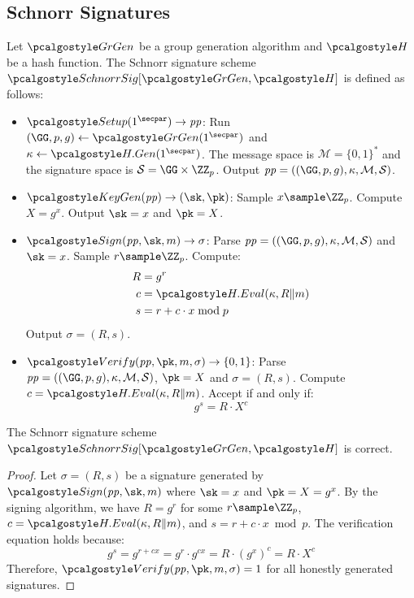 \subsection{Schnorr Signatures}

\begin{definition}\label{def:schnorr}
  Let $\grgen$ be a group generation algorithm and $\algo{H}$ be a hash function. The Schnorr signature scheme $\algo{SchnorrSig}[\grgen, \algo{H}]$ is defined as follows:
  \begin{itemize}
    \item $\algo{Setup}(1^\secpar) \rightarrow \params$: Run $\gparam \gets \grgen(1^\secpar)$ and $\kappa \gets \algo{H.Gen}(1^\secpar)$. The message space is $\mathcal{M} = \{0,1\}^*$ and the signature space is $\mathcal{S} = \GG \times \ZZ_p$. Output $\params = (\gparam, \kappa, \mathcal{M}, \mathcal{S})$.
    
    \item $\algo{KeyGen}(\params) \rightarrow (\sk, \pk)$: Sample $x \sample \ZZ_p$. Compute $X = g^x$. Output $\sk = x$ and $\pk = X$.
    
    \item $\algo{Sign}(\params, \sk, m) \rightarrow \sigma$: Parse $\params = (\gparam, \kappa, \mathcal{M}, \mathcal{S})$ and $\sk = x$. Sample $r \sample \ZZ_p$. Compute:
    \begin{align*}
      R &= g^r \\
      c &= \algo{H.Eval}(\kappa, R \| m) \\
      s &= r + c \cdot x \bmod p
    \end{align*}
    Output $\sigma = (R, s)$.
    
    \item $\algo{Verify}(\params, \pk, m, \sigma) \rightarrow \{0, 1\}$: Parse $\params = (\gparam, \kappa, \mathcal{M}, \mathcal{S})$, $\pk = X$ and $\sigma = (R, s)$. Compute $c = \algo{H.Eval}(\kappa, R \| m)$. Accept if and only if:
    \[
      g^s = R \cdot X^c
    \]
  \end{itemize}
\end{definition}

\begin{lemma}\label{lem:schnorr-correctness}
  The Schnorr signature scheme $\algo{SchnorrSig}[\grgen, \algo{H}]$ is correct.
\end{lemma}

\begin{proof}
  Let $\sigma = (R, s)$ be a signature generated by $\algo{Sign}(\params, \sk, m)$ where $\sk = x$ and $\pk = X = g^x$. By the signing algorithm, we have $R = g^r$ for some $r \sample \ZZ_p$, $c = \algo{H.Eval}(\kappa, R \| m)$, and $s = r + c \cdot x \bmod p$. The verification equation holds because:
  \[
    g^s = g^{r + cx} = g^r \cdot g^{cx} = R \cdot (g^x)^c = R \cdot X^c
  \]
  Therefore, $\algo{Verify}(\params, \pk, m, \sigma) = 1$ for all honestly generated signatures.
\end{proof}

